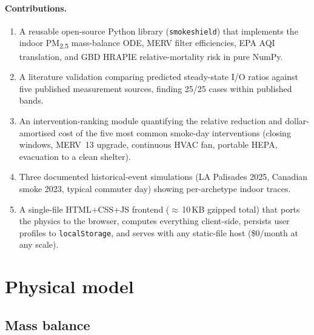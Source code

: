 \documentclass[10pt,twocolumn]{article}
\begin{document}
\paragraph{Contributions.}
\begin{enumerate}\setlength{\itemsep}{0pt}
\item A reusable open-source Python library
(\texttt{smokeshield}) that implements the indoor PM\textsubscript{2.5}
mass-balance ODE, MERV filter efficiencies, EPA AQI translation, and
GBD HRAPIE relative-mortality risk in pure NumPy.
\item A literature validation comparing predicted steady-state I/O
ratios against five published measurement sources, finding 25/25 cases
within published bands.
\item An intervention-ranking module quantifying the relative
reduction and dollar-amortised cost of the five most common smoke-day
interventions (closing windows, MERV~13 upgrade, continuous HVAC fan,
portable HEPA, evacuation to a clean shelter).
\item Three documented historical-event simulations (LA Palisades
2025, Canadian smoke 2023, typical commuter day) showing
per-archetype indoor traces.
\item A single-file HTML+CSS+JS frontend ($\approx$\,10\,KB gzipped total) that
ports the physics to the browser, computes everything client-side,
persists user profiles to \texttt{localStorage}, and serves with any
static-file host (\$0/month at any scale).
\end{enumerate}

\section{Physical model}

\subsection{Mass balance}
\end{document}
